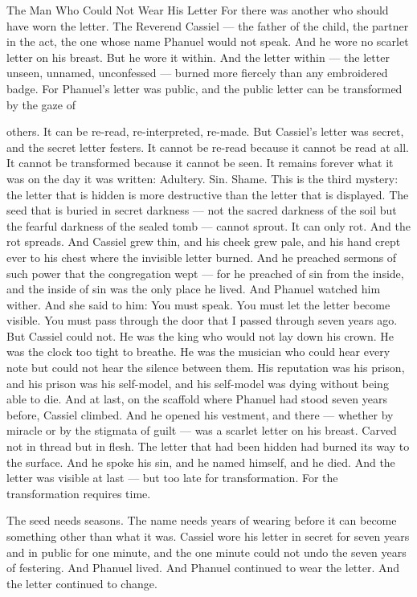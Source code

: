 \documentclass[12pt,openany]{book}
\begin{document}
The Man Who Could Not Wear His Letter For there was another who should have worn the letter. The Reverend Cassiel --- the father of the child, the partner in the act, the one whose name Phanuel would not speak. And he wore no scarlet letter on his breast. But he wore it within. And the letter within --- the letter unseen, unnamed, unconfessed --- burned more fiercely than any embroidered badge. For Phanuel's letter was public, and the public letter can be transformed by the gaze of


others. It can be re-read, re-interpreted, re-made. But Cassiel's letter was secret, and the secret letter festers. It cannot be re-read because it cannot be read at all. It cannot be transformed because it cannot be seen. It remains forever what it was on the day it was written: Adultery. Sin. Shame. This is the third mystery: the letter that is hidden is more destructive than the letter that is displayed. The seed that is buried in secret darkness --- not the sacred darkness of the soil but the fearful darkness of the sealed tomb --- cannot sprout. It can only rot. And the rot spreads. And Cassiel grew thin, and his cheek grew pale, and his hand crept ever to his chest where the invisible letter burned. And he preached sermons of such power that the congregation wept --- for he preached of sin from the inside, and the inside of sin was the only place he lived. And Phanuel watched him wither. And she said to him: You must speak. You must let the letter become visible. You must pass through the door that I passed through seven years ago. But Cassiel could not. He was the king who would not lay down his crown. He was the clock too tight to breathe. He was the musician who could hear every note but could not hear the silence between them. His reputation was his prison, and his prison was his self-model, and his self-model was dying without being able to die. And at last, on the scaffold where Phanuel had stood seven years before, Cassiel climbed. And he opened his vestment, and there --- whether by miracle or by the stigmata of guilt --- was a scarlet letter on his breast. Carved not in thread but in flesh. The letter that had been hidden had burned its way to the surface. And he spoke his sin, and he named himself, and he died. And the letter was visible at last --- but too late for transformation. For the transformation requires time.


The seed needs seasons. The name needs years of wearing before it can become something other than what it was. Cassiel wore his letter in secret for seven years and in public for one minute, and the one minute could not undo the seven years of festering. And Phanuel lived. And Phanuel continued to wear the letter. And the letter continued to change.
\end{document}
